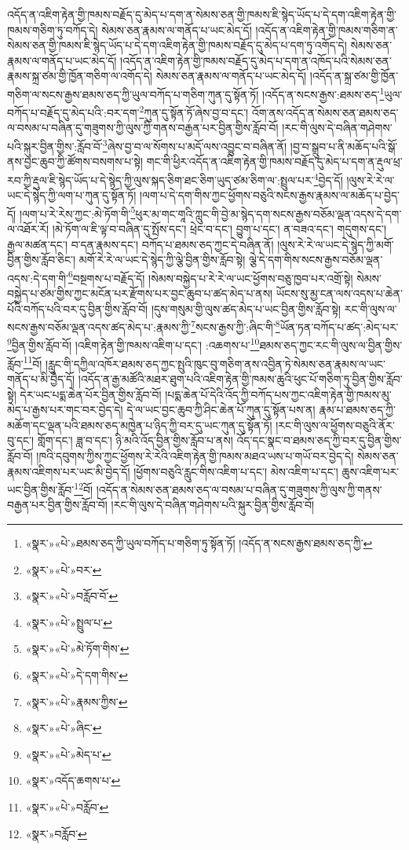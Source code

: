 འདོད་ན་འཇིག་རྟེན་གྱི་ཁམས་བརྗོད་དུ་མེད་པ་དག་ན་སེམས་ཅན་གྱི་ཁམས་ཇི་སྙེད་ཡོད་པ་དེ་དག་འཇིག་རྟེན་གྱི་ཁམས་གཅིག་ཏུ་བཀོད་དེ། སེམས་ཅན་རྣམས་ལ་གནོད་པ་ཡང་མེད་དོ། །འདོད་ན་འཇིག་རྟེན་གྱི་ཁམས་གཅིག་ན་སེམས་ཅན་གྱི་ཁམས་ཇི་སྙེད་ཡོད་པ་དེ་དག་འཇིག་རྟེན་གྱི་ཁམས་བརྗོད་དུ་མེད་པ་དག་ཏུ་འགོད་དེ། སེམས་ཅན་རྣམས་ལ་གནོད་པ་ཡང་མེད་དོ། །འདོད་ན་འཇིག་རྟེན་གྱི་ཁམས་བརྗོད་དུ་མེད་པ་དག་ན་འཁོད་པའི་སེམས་ཅན་རྣམས་སྐྲ་ཙམ་གྱི་ཁྱོན་གཅིག་ལ་འགོད་དེ། སེམས་ཅན་རྣམས་ལ་གནོད་པ་ཡང་མེད་དོ། །འདོད་ན་སྐྲ་ཙམ་གྱི་ཁྱོན་གཅིག་ལ་སངས་རྒྱས་ཐམས་ཅད་ཀྱི་ཡུལ་བཀོད་པ་གཅིག་ཀུན་དུ་སྟོན་ཏོ། །འདོད་ན་སངས་རྒྱས་:ཐམས་ཅད་\footnote{«སྣར་»«པེ་»ཐམས་ཅད་ཀྱི་ཡུལ་བཀོད་པ་གཅིག་ཏུ་སྟོན་ཏོ། །འདོད་ན་སངས་རྒྱས་ཐམས་ཅད་ཀྱི་}ཡུལ་བཀོད་པ་བརྗོད་དུ་མེད་པའི་:བར་དག་\footnote{«སྣར་»«པེ་»བར་}ཀུན་དུ་སྟོན་ཏོ་ཞེས་བྱ་བ་དང་། འོག་ནས་འདོད་ན་སེམས་ཅན་ཐམས་ཅད་ལ་བསམ་པ་བཞིན་དུ་གཟུགས་ཀྱི་ལུས་ཀྱི་གནས་བརྒྱན་པར་བྱིན་གྱིས་རློབ་བོ། །རང་གི་ལུས་དེ་བཞིན་གཤེགས་པའི་སྐུར་བྱིན་གྱིས་:རློབ་བོ་\footnote{«སྣར་»«པེ་»བརློབ་བོ་}ཞེས་བྱ་བ་ལ་སོགས་པ་མདོ་ལས་འབྱུང་བ་བཞིན་ནོ། །བྱ་བ་སྒྲུབ་པ་ནི་མཆོད་པའི་སྒོ་ནས་བྱང་ཆུབ་ཀྱི་ཚོགས་བསགས་པ་སྟེ། གང་གི་ཕྱིར་འདོད་ན་འཇིག་རྟེན་གྱི་ཁམས་བརྗོད་དུ་མེད་པ་དག་ན་རྡུལ་ཕྲ་རབ་ཀྱི་རྡུལ་ཇི་སྙེད་ཡོད་པ་དེ་སྙེད་ཀྱི་ལུས་སྐད་ཅིག་ཐང་ཅིག་ཡུད་ཙམ་ཅིག་ལ་:སྤྲུལ་པར་\footnote{«སྣར་»«པེ་»སྤྲུལ་པ་}བྱེད་དོ། །ལུས་རེ་རེ་ལ་ཡང་དེ་སྙེད་ཀྱི་ལག་པ་ཀུན་དུ་སྟོན་ཏོ། །ལག་པ་དེ་དག་གིས་ཀྱང་ཕྱོགས་བཅུའི་སངས་རྒྱས་རྣམས་ལ་མཆོད་པ་བྱེད་དོ། །ལག་པ་རེ་རེས་ཀྱང་:མེ་ཏོག་གི་\footnote{«སྣར་»«པེ་»མེ་ཏོག་གིས་}ཕུར་མ་གང་གཱའི་ཀླུང་གི་བྱེ་མ་སྙེད་དག་སངས་རྒྱས་བཅོམ་ལྡན་འདས་དེ་དག་ལ་འཐོར་རོ། །མེ་ཏོག་ལ་ཇི་ལྟ་བ་བཞིན་དུ་སྤོས་དང་། ཕྲེང་བ་དང་། བྱུག་པ་དང་། ན་བཟའ་དང་། གདུགས་དང་། རྒྱལ་མཚན་དང་། བ་དན་རྣམས་དང་། བཀོད་པ་ཐམས་ཅད་ཀྱང་དེ་བཞིན་ནོ། །ལུས་རེ་རེ་ལ་ཡང་དེ་སྙེད་ཀྱི་མགོ་བྱིན་གྱིས་རློབ་ཅིང་། མགོ་རེ་རེ་ལ་ཡང་དེ་སྙེད་ཀྱི་ལྕེ་བྱིན་གྱིས་རློབ་སྟེ། ལྕེ་དེ་དག་གིས་སངས་རྒྱས་བཅོམ་ལྡན་འདས་:དེ་དག་གི་\footnote{«སྣར་»«པེ་»དེ་དག་གིས་}བསྔགས་པ་བརྗོད་དོ། །སེམས་བསྐྱེད་པ་རེ་རེ་ལ་ཡང་ཕྱོགས་བཅུ་ཁྱབ་པར་འགྲོ་སྟེ། སེམས་བསྐྱེད་པ་ཙམ་གྱིས་ཀྱང་མངོན་པར་རྫོགས་པར་བྱང་ཆུབ་པ་ཚད་མེད་པ་ནས། ཡོངས་སུ་མྱ་ངན་ལས་འདས་པ་ཆེན་པོའི་བཀོད་པའི་བར་དུ་བྱིན་གྱིས་རློབ་བོ། །དུས་གསུམ་གྱི་ལུས་ཚད་མེད་པ་ཡང་བྱིན་གྱིས་རློབ་སྟེ། རང་གི་ལུས་ལ་སངས་རྒྱས་བཅོམ་ལྡན་འདས་ཚད་མེད་པ་:རྣམས་ཀྱི་\footnote{«སྣར་»«པེ་»རྣམས་ཀྱིས་}སངས་རྒྱས་ཀྱི་:ཞིང་གི་\footnote{«སྣར་»«པེ་»ཞིང་}ཡོན་ཏན་བཀོད་པ་ཚད་:མེད་པར་\footnote{«སྣར་»«པེ་»མེད་པ་}བྱིན་གྱིས་རློབ་བོ། །འཇིག་རྟེན་གྱི་ཁམས་འཇིག་པ་དང་། :འཆགས་པ་\footnote{«སྣར་»འདོད་ཆགས་པ་}ཐམས་ཅད་ཀྱང་རང་གི་ལུས་ལ་བྱིན་གྱིས་རློབ་\footnote{«སྣར་»«པེ་»བརློབ་}བོ། །རླུང་གི་དཀྱིལ་འཁོར་ཐམས་ཅད་ཀྱང་སྤུའི་ཁུང་བུ་གཅིག་ནས་འབྱིན་ཏེ་སེམས་ཅན་རྣམས་ལ་ཡང་གནོད་པ་མི་བྱེད་དོ། །འདོད་ན་རྒྱ་མཚོའི་མཐར་ཐུག་པའི་འཇིག་རྟེན་གྱི་ཁམས་ཆུའི་ཕུང་པོ་གཅིག་ཏུ་བྱིན་གྱིས་རློབ་སྟེ། དེར་ཡང་པདྨ་ཆེན་པོར་བྱིན་གྱིས་རློབ་བོ། །པདྨ་ཆེན་པོ་དེའི་འོད་ཀྱི་བཀོད་པས་ཀྱང་འཇིག་རྟེན་གྱི་ཁམས་མུ་མེད་པ་རྒྱས་པར་གང་བར་བྱེད་དེ། དེ་ལ་ཡང་བྱང་ཆུབ་ཀྱི་ཤིང་ཆེན་པོ་ཀུན་དུ་སྟོན་པས་ན། རྣམ་པ་ཐམས་ཅད་ཀྱི་མཆོག་དང་ལྡན་པའི་ཐམས་ཅད་མཁྱེན་པ་ཉིད་ཀྱི་བར་དུ་ཡང་ཀུན་དུ་སྟོན་ཏོ། །རང་གི་ལུས་ལ་ཕྱོགས་བཅུའི་ནོར་བུ་དང་། གློག་དང་། ཟླ་བ་དང་། ཉི་མའི་འོད་བྱིན་གྱིས་རློབ་པ་ནས། འོད་དང་སྣང་བ་ཐམས་ཅད་ཀྱི་བར་དུ་བྱིན་གྱིས་རློབ་བོ། །ཁའི་དབུགས་ཀྱིས་ཀྱང་ཕྱོགས་རེ་རེའི་འཇིག་རྟེན་གྱི་ཁམས་མཐའ་ཡས་པ་གཡོ་བར་བྱེད་དེ། སེམས་ཅན་རྣམས་འཇིགས་པར་ཡང་མི་བྱེད་དོ། །ཕྱོགས་བཅུའི་རླུང་གིས་འཇིག་པ་དང་། མེས་འཇིག་པ་དང་། ཆུས་འཇིག་པར་ཡང་བྱིན་གྱིས་རློབ་\footnote{«སྣར་»བརློབ་}བོ། །འདོད་ན་སེམས་ཅན་ཐམས་ཅད་ལ་བསམ་པ་བཞིན་དུ་གཟུགས་ཀྱི་ལུས་ཀྱི་གནས་བརྒྱན་པར་བྱིན་གྱིས་རློབ་བོ། །རང་གི་ལུས་དེ་བཞིན་གཤེགས་པའི་སྐུར་བྱིན་གྱིས་རློབ་བོ། 